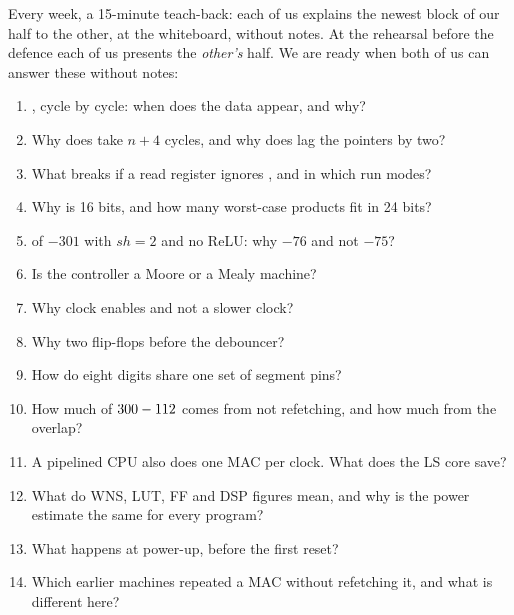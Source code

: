 Every week, a 15-minute teach-back: each of us explains the newest block of our half to the other, at the whiteboard, without notes. At the rehearsal before the defence each of us presents the \emph{other's} half. We are ready when both of us can answer these without notes:

\begin{enumerate}[leftmargin=1.8em,itemsep=0.1em]
\item {}, cycle by cycle: when does the data appear, and why?
\item Why does  take $n+4$ cycles, and why does  lag the pointers by two?
\item What breaks if a read register ignores , and in which run modes?
\item Why is  16 bits, and how many worst-case products fit in 24 bits?
\item {} of $-301$ with $sh = 2$ and no ReLU: why $-76$ and not $-75$?
\item Is the controller a Moore or a Mealy machine?
\item Why clock enables and not a slower clock?
\item Why two flip-flops before the debouncer?
\item How do eight digits share one set of segment pins?
\item How much of $300 - 112$ comes from not refetching, and how much from the overlap?
\item A pipelined CPU also does one MAC per clock. What does the LS core save?
\item What do WNS, LUT, FF and DSP figures mean, and why is the power estimate the same for every program?
\item What happens at power-up, before the first reset?
\item Which earlier machines repeated a MAC without refetching it, and what is different here?
\end{enumerate}
